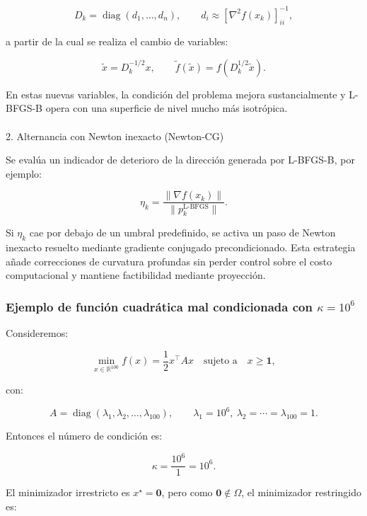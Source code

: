 \documentclass[
  spanish,
  us-letterpaper,
  DIV=11,
  numbers=noendperiod]{scrreprt}
\makeatletter
\let\oldparagraph\paragraph
\renewcommand{\paragraph}{
    \@ifstar
      \xxxParagraphStar
      \xxxParagraphNoStar
  }
\newcommand{\xxxParagraphStar}[1]{\oldparagraph*{#1}\mbox{}}
\newcommand{\xxxParagraphNoStar}[1]{\oldparagraph{#1}\mbox{}}
\numberwithin{equation}{section}
\makeatother
\begin{document}
\[
D_k = \operatorname{diag}(d_1,\dots,d_n), \qquad d_i \approx [\nabla^2 f(x_k)]_{ii}^{-1},
\]

a partir de la cual se realiza el cambio de variables:

\[
\tilde{x} = D_k^{-1/2} x, \qquad 
\tilde{f}(\tilde{x}) = f(D_k^{1/2}\tilde{x}).
\]

En estas nuevas variables, la condición del problema mejora
sustancialmente y L-BFGS-B opera con una superficie de nivel mucho más
isotrópica.

\paragraph{2. Alternancia con Newton inexacto
(Newton-CG)}\label{alternancia-con-newton-inexacto-newton-cg}

Se evalúa un indicador de deterioro de la dirección generada por
L-BFGS-B, por ejemplo:

\[
\eta_k = \frac{\|\nabla f(x_k)\|}{\|p_k^{\text{L-BFGS}}\|}.
\]

Si \(\eta_k\) cae por debajo de un umbral predefinido, se activa un paso
de Newton inexacto resuelto mediante gradiente conjugado
precondicionado. Esta estrategia añade correcciones de curvatura
profundas sin perder control sobre el costo computacional y mantiene
factibilidad mediante proyección.

\subsubsection{\texorpdfstring{Ejemplo de función cuadrática mal
condicionada con
\(\kappa = 10^6\)}{Ejemplo de función cuadrática mal condicionada con \textbackslash kappa = 10\^{}6}}\label{ejemplo-de-funciuxf3n-cuadruxe1tica-mal-condicionada-con-kappa-106}

Consideremos:

\[
\min_{x \in \mathbb{R}^{100}} f(x) = \frac{1}{2} x^\top A x
\quad \text{sujeto a} \quad
x \ge \mathbf{1},
\]

con:

\[
A = \operatorname{diag}(\lambda_1,\lambda_2,\dots,\lambda_{100}), \qquad
\lambda_1 = 10^6,\ \lambda_2=\cdots=\lambda_{100}=1.
\]

Entonces el número de condición es:

\[
\kappa = \frac{10^6}{1} = 10^6.
\]

El minimizador irrestricto es \(x^\star = \mathbf{0}\), pero como
\(\mathbf{0} \notin \Omega\), el minimizador restringido es:
\end{document}
